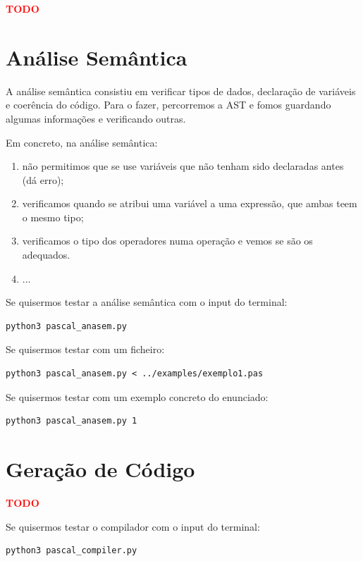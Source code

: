 \documentclass[12pt,a4paper]{report}
\begin{document}
\textcolor{red}{\textbf{TODO}}

\chapter{Análise Semântica}

A análise semântica consistiu em verificar tipos de dados, declaração de variáveis e coerência do código. Para o fazer, percorremos a AST e fomos guardando algumas informações
e verificando outras.

Em concreto, na análise semântica:
\begin{enumerate}
    \item não permitimos que se use variáveis que não tenham sido declaradas antes (dá erro);
    \item verificamos quando se atribui uma variável a uma expressão, que ambas teem o mesmo tipo;
    \item verificamos o tipo dos operadores numa operação e vemos se são os adequados.
    \item ...
\end{enumerate}

\vspace{1em}

Se quisermos testar a análise semântica com o input do terminal:
\begin{verbatim}
python3 pascal_anasem.py
\end{verbatim}

Se quisermos testar com um ficheiro:
\begin{verbatim}
python3 pascal_anasem.py < ../examples/exemplo1.pas
\end{verbatim}

Se quisermos testar com um exemplo concreto do enunciado:
\begin{verbatim}
python3 pascal_anasem.py 1
\end{verbatim}

\chapter{Geração de Código}

\textcolor{red}{\textbf{TODO}}



\vspace{1em}

Se quisermos testar o compilador com o input do terminal:
\begin{verbatim}
python3 pascal_compiler.py
\end{verbatim}
\end{document}
